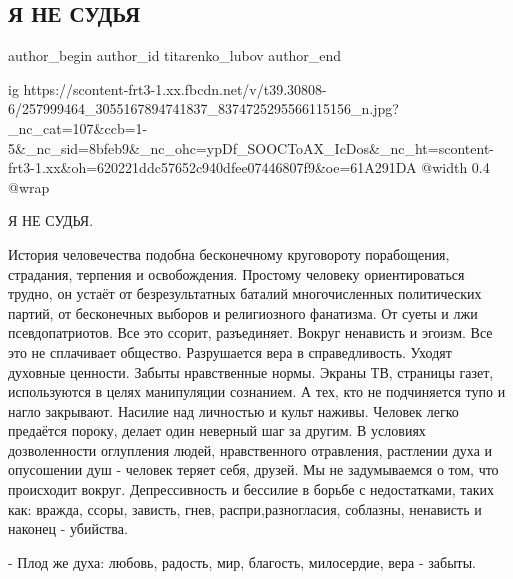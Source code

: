  
 
 
 
 
 
\subsection{Я НЕ СУДЬЯ}
\label{sec:19_11_2021.fb.titarenko_lubov.1.ja_ne_sudja}
 
\ifcmt
 author_begin
   author_id titarenko_lubov
 author_end
\fi

\ifcmt
  ig https://scontent-frt3-1.xx.fbcdn.net/v/t39.30808-6/257999464_3055167894741837_8374725295566115156_n.jpg?_nc_cat=107&ccb=1-5&_nc_sid=8bfeb9&_nc_ohc=ypDf_SOOCToAX_IcDos&_nc_ht=scontent-frt3-1.xx&oh=620221ddc57652c940dfee07446807f9&oe=61A291DA
  @width 0.4
  @wrap 
\fi

Я НЕ СУДЬЯ.

История человечества подобна  бесконечному круговороту  порабощения, страдания,
терпения и освобождения.  Простому человеку ориентироваться трудно, он устаёт
от безрезультатных баталий многочисленных политических партий, от бесконечных
выборов  и религиозного фанатизма.  От суеты и лжи псевдопатриотов. Все это
ссорит, разъединяет.  Вокруг ненависть и эгоизм. Все это не сплачивает
общество.  Разрушается вера в справедливость. Уходят духовные ценности.  Забыты
нравственные нормы.  Экраны ТВ, страницы газет, используются в целях
манипуляции сознанием. А тех, кто не подчиняется тупо и нагло закрывают.
Насилие над личностью и культ наживы. Человек легко предаётся пороку, делает
один неверный шаг за другим. В условиях дозволенности оглупления людей,
нравственного отравления, растлении духа и опусошении душ - человек теряет
себя, друзей. Мы не задумываемся о том, что происходит вокруг.  Депрессивность
и бессилие в борьбе с недостатками, таких как: вражда, ссоры, зависть, гнев,
распри,разногласия, соблазны, ненависть и наконец - убийства. 

- Плод же духа: любовь, радость, мир, благость, милосердие, вера - забыты. 

